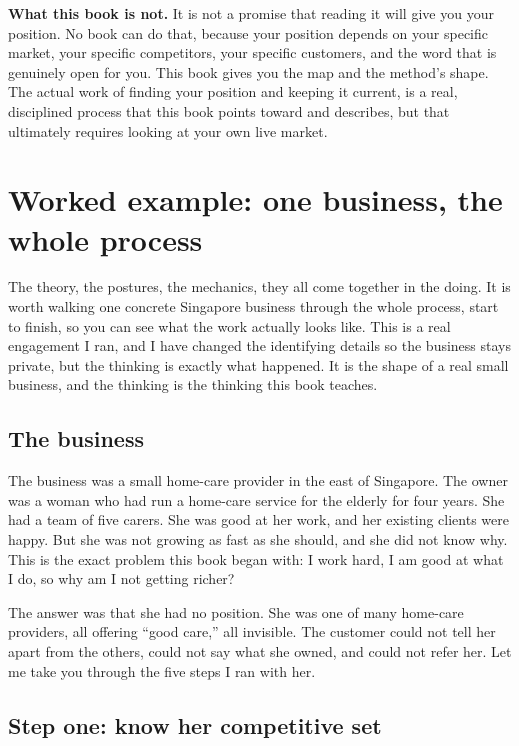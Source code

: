 \documentclass[10pt,twoside,openany]{memoir}
\newcommand{\needspacehead}{\needspace{4\baselineskip}}
\let\oldsection\section
\renewcommand{\section}{\needspacehead\oldsection}
\begin{document}
\textbf{What this book is not.} It is not a promise that reading it will
give you your position. No book can do that, because your position
depends on your specific market, your specific competitors, your
specific customers, and the word that is genuinely open for you. This
book gives you the map and the method's shape. The actual work of
finding your position and keeping it current, is a real, disciplined
process that this book points toward and describes, but that ultimately
requires looking at your own live market.

\FloatBarrier
\chapter{Worked example: one business, the whole
process}\label{worked-example-one-business-the-whole-process}

The theory, the postures, the mechanics, they all come together in the
doing. It is worth walking one concrete Singapore business through the
whole process, start to finish, so you can see what the work actually
looks like. This is a real engagement I ran, and I have changed the
identifying details so the business stays private, but the thinking is
exactly what happened. It is the shape of a real small business, and the
thinking is the thinking this book teaches.

\section{The business}\label{the-business}

The business was a small home-care provider in the east of Singapore.
The owner was a woman who had run a home-care service for the elderly
for four years. She had a team of five carers. She was good at her work,
and her existing clients were happy. But she was not growing as fast as
she should, and she did not know why. This is the exact problem this
book began with: I work hard, I am good at what I do, so why am I not
getting richer?

The answer was that she had no position. She was one of many home-care
providers, all offering ``good care,'' all invisible. The customer could
not tell her apart from the others, could not say what she owned, and
could not refer her. Let me take you through the five steps I ran with
her.

\section{Step one: know her competitive
set}\label{step-one-know-her-competitive-set}
\end{document}
